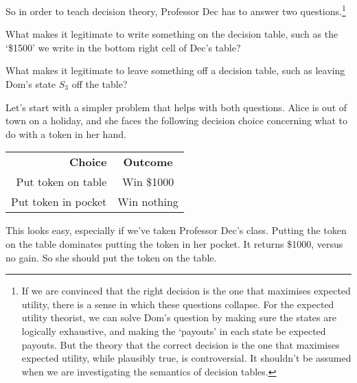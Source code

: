So in order to teach decision theory, Professor Dec has to answer two questions.\footnote{If we are convinced that the right decision is the one that maximises expected utility, there is a sense in which these questions collapse. For the expected utility theorist, we can solve Dom's question by making sure the states are logically exhaustive, and making the `payouts' in each state be expected payouts. But the theory that the correct decision is the one that maximises expected utility, while plausibly true, is controversial. It shouldn't be assumed when we are investigating the semantics of decision tables.}

\begin{enumerate*}
\item What makes it legitimate to write something on the decision table, such as the `\$1500' we write in the bottom right cell of Dec's table?
\item What makes it legitimate to leave something off a decision table, such as leaving Dom's state $S_3$ off the table?
\end{enumerate*}

\noindent Let's start with a simpler problem that helps with both questions. Alice is out of town on a holiday, and she faces the following decision choice concerning what to do with a token in her hand.

\begin{center}
\begin{tabular}{r c}
\textbf{Choice} & \textbf{Outcome} \\
Put token on table & Win \$1000 \\
Put token in pocket & Win nothing
\end{tabular}
\end{center}

\noindent This looks easy, especially if we've taken Professor Dec's class. Putting the token on the table dominates putting the token in her pocket. It returns \$1000, versus no gain. So she should put the token on the table.

